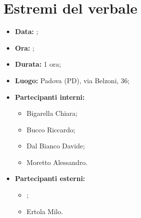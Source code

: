 \section{Estremi del verbale}
\begin{itemize}
	\item \textbf{Data:} ;
	\item \textbf{Ora:} ;
	\item \textbf{Durata:} 1 ora;
	\item \textbf{Luogo:} Padova (PD), via Belzoni, 36;
	\item \textbf{Partecipanti interni:}
	\begin{itemize}
		\item Bigarella Chiara;
		\item Bucco Riccardo;
		\item Dal Bianco Davide;
		\item Moretto Alessandro.
	\end{itemize}
	\item \textbf{Partecipanti esterni:}
	\begin{itemize}
		\item \proponente;
		\item Ertola Milo.
	\end{itemize}
\end{itemize}
\newpage